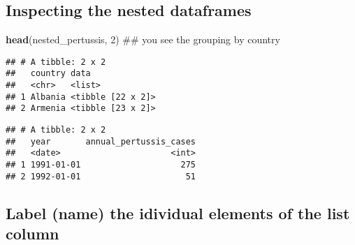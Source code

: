 \documentclass[]{article}
\newenvironment{Shaded}{\begin{snugshade}}{\end{snugshade}}
\newcommand{\KeywordTok}[1]{\textcolor[rgb]{0.13,0.29,0.53}{\textbf{#1}}}
\newcommand{\DecValTok}[1]{\textcolor[rgb]{0.00,0.00,0.81}{#1}}
\newcommand{\StringTok}[1]{\textcolor[rgb]{0.31,0.60,0.02}{#1}}
\newcommand{\OperatorTok}[1]{\textcolor[rgb]{0.81,0.36,0.00}{\textbf{#1}}}
\newcommand{\NormalTok}[1]{#1}
\begin{document}
\begin{Shaded}
\end{Shaded}

\subsection{Inspecting the nested
dataframes}\label{inspecting-the-nested-dataframes}

\begin{Shaded}
\begin{Highlighting}[]
\KeywordTok{head}\NormalTok{(nested_pertussis, }\DecValTok{2}\NormalTok{) ## you see the grouping by country}
\end{Highlighting}
\end{Shaded}

\begin{verbatim}
## # A tibble: 2 x 2
##   country data             
##   <chr>   <list>           
## 1 Albania <tibble [22 x 2]>
## 2 Armenia <tibble [23 x 2]>
\end{verbatim}

\begin{Shaded}
\end{Shaded}

\begin{verbatim}
## # A tibble: 2 x 2
##   year       annual_pertussis_cases
##   <date>                      <int>
## 1 1991-01-01                    275
## 2 1992-01-01                     51
\end{verbatim}

\subsection{Label (name) the idividual elements of the list
column}\label{label-name-the-idividual-elements-of-the-list-column}
\end{document}

